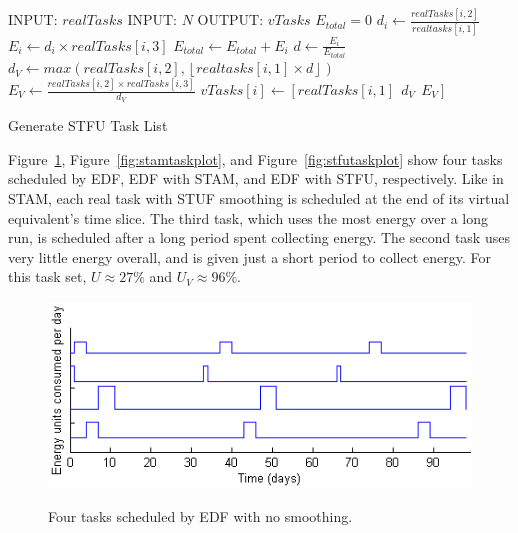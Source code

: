 
\begin{algorithm}[htb]
\label{alg:stfualg}
\begin{algorithmic}
\STATE INPUT: $realTasks$  
\STATE INPUT: $N$ 
\STATE OUTPUT: $vTasks$ 
\STATE $E_{total} = 0$
\STATE $d_i \gets \frac{realTasks[i, 2]}{realtasks[i,1]}$
\STATE $E_i \gets d_i \times realTasks[i,3]$
\STATE $E_{total} \gets E_{total} + E_i$
\ENDFOR
{}
\STATE $d \gets \frac{E_i}{E_{total}}$
\STATE $d_{V} \gets max(realTasks[i, 2], \left \lfloor realtasks[i, 1] \times d \right \rfloor)$
\STATE $E_V \gets \frac{realTasks[i,2]\times realTasks[i,3]}{d_{V}}$
\STATE $vTasks[i] \gets [realTasks[i,1]~~d_{V}~~E_V]$
\ENDFOR
\end{algorithmic}
\caption{Generate STFU Task List}
\end{algorithm}

Figure~\ref{fig:edftasksched}, Figure~\ref{fig:stamtaskplot}, and Figure~\ref{fig:stfutaskplot} show four tasks scheduled by EDF, EDF with STAM, and EDF with STFU, respectively.  Like in STAM, each real task with STUF smoothing is scheduled at the end of its virtual equivalent's time slice.  The third task, which uses the most energy over a long run, is scheduled after a long period spent collecting energy.  The second task uses very little energy overall, and is given just a short period to collect energy.  For this task set, $U \approx 27\%$ and $U_V \approx 96\%$.


\begin{figure}[htb]
\includegraphics[scale=0.72]{edftasks.png}
\label{fig:edftasksched}
\caption{Four tasks scheduled by EDF with no smoothing.}
\end{figure}

